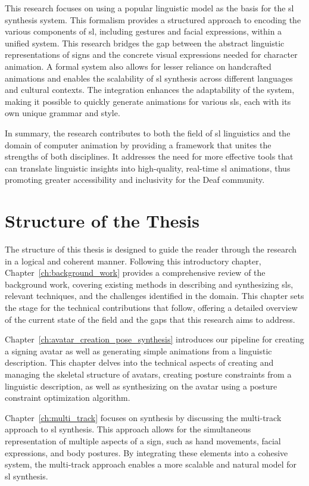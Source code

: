 \documentclass[../../main.tex]{subfiles}
\begin{document}
This research focuses on using a popular linguistic model as the basis for the \gls{sl} synthesis system. This formalism provides a structured approach to encoding the various components of \gls{sl}, including gestures and facial expressions, within a unified system. This research bridges the gap between the abstract linguistic representations of signs and the concrete visual expressions needed for character animation. A formal system also allows for lesser reliance on handcrafted animations and enables the scalability of \gls{sl} synthesis across different languages and cultural contexts. The integration enhances the adaptability of the system, making it possible to quickly generate animations for various \gls{sl}s, each with its own unique grammar and style.

In summary, the research contributes to both the field of \gls{sl} linguistics and the domain of computer animation by providing a framework that unites the strengths of both disciplines. It addresses the need for more effective tools that can translate linguistic insights into high-quality, real-time \gls{sl} animations, thus promoting greater accessibility and inclusivity for the Deaf community.

\section{Structure of the Thesis}
\label{ch:introduction:structure}

The structure of this thesis is designed to guide the reader through the research in a logical and coherent manner. Following this introductory chapter, Chapter~\ref{ch:background_work} provides a comprehensive review of the background work, covering existing methods in describing and synthesizing \gls{sl}s, relevant techniques, and the challenges identified in the domain. This chapter sets the stage for the technical contributions that follow, offering a detailed overview of the current state of the field and the gaps that this research aims to address.

Chapter~\ref{ch:avatar_creation_pose_synthesis} introduces our pipeline for creating a signing avatar as well as generating simple animations from a linguistic description. This chapter delves into the technical aspects of creating and managing the skeletal structure of avatars, creating posture constraints from a linguistic description, as well as synthesizing on the avatar using a posture constraint optimization algorithm.

Chapter~\ref{ch:multi_track} focuses on synthesis by discussing the multi-track approach to \gls{sl} synthesis. This approach allows for the simultaneous representation of multiple aspects of a sign, such as hand movements, facial expressions, and body postures. By integrating these elements into a cohesive system, the multi-track approach enables a more scalable and natural model for \gls{sl} synthesis.
\end{document}
